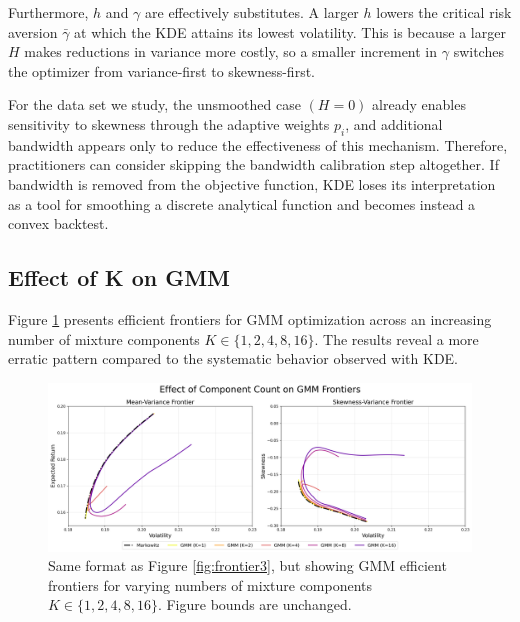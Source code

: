 Furthermore, $h$ and $\gamma$ are effectively substitutes. A larger $h$ lowers the critical risk aversion $\bar\gamma$ at which the KDE attains its lowest volatility. This is because a larger $H$ makes reductions in variance more costly, so a smaller increment in $\gamma$ switches the optimizer from variance-first to skewness-first. 

For the data set we study, the unsmoothed case $(H=0)$ already enables sensitivity to skewness through the adaptive weights $p_i$, and additional bandwidth appears only to reduce the effectiveness of this mechanism. Therefore, practitioners can consider skipping the bandwidth calibration step altogether. If bandwidth is removed from the objective function, KDE loses its interpretation as a tool for smoothing a discrete analytical function and becomes instead a convex backtest.

\subsection{Effect of K on GMM}
\label{sec:kongmm}
Figure \ref{fig:frontier4} presents efficient frontiers for GMM optimization across an increasing number of mixture components $K\in\{1,2,4,8,16\}$. The results reveal a more erratic pattern compared to the systematic behavior observed with KDE.

\vspace{5mm}
\begin{figure}[H]
    \begin{center}
    \begin{minipage}{1\textwidth}
      \centering
      \includegraphics[width=\textwidth]{images/30_4.png}
    \end{minipage}
    \caption[Mean/Skewness-variance frontiers: GMM - Changing $K$]{Same format as Figure \ref{fig:frontier3}, but showing GMM efficient frontiers for varying numbers of mixture components $K\in\{1,2,4,8,16\}$. Figure bounds are unchanged.}
    \label{fig:frontier4}
    \end{center}
    \end{figure}

